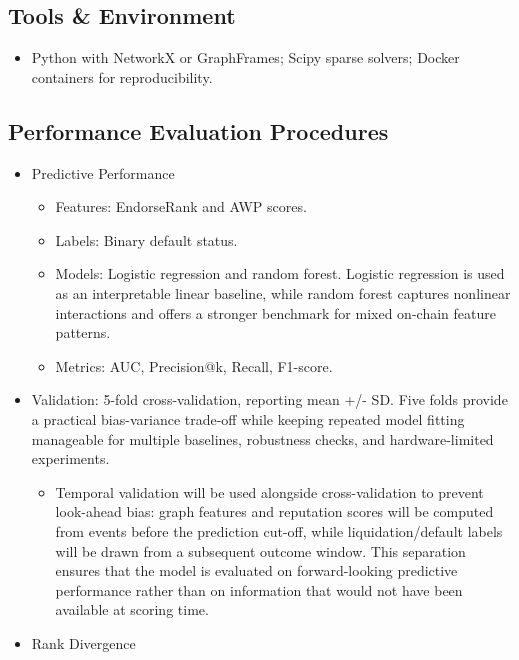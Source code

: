 \documentclass[
]{article}
\begin{document}
\subsection{Tools \& Environment}\label{tools-environment}

\begin{itemize}
\item
  Python with NetworkX or GraphFrames; Scipy sparse solvers; Docker containers for reproducibility.
\end{itemize}

\subsection{Performance Evaluation Procedures}\label{performance-evaluation-procedures}

\begin{itemize}
\item
  Predictive Performance

  \begin{itemize}
  \item
    Features: EndorseRank and AWP scores.
  \item
    Labels: Binary default status.
  \item
    Models: Logistic regression and random forest. Logistic regression is used as an interpretable linear baseline, while random forest captures nonlinear interactions and offers a stronger benchmark for mixed on-chain feature patterns.
  \item
    Metrics: AUC, Precision@k, Recall, F1-score.
  \end{itemize}
\item
  Validation: 5-fold cross-validation, reporting mean +/- SD. Five folds provide a practical bias-variance trade-off while keeping repeated model fitting manageable for multiple baselines, robustness checks, and hardware-limited experiments.

  \begin{itemize}
  \item
    Temporal validation will be used alongside cross-validation to prevent look-ahead bias: graph features and reputation scores will be computed from events before the prediction cut-off, while liquidation/default labels will be drawn from a subsequent outcome window. This separation ensures that the model is evaluated on forward-looking predictive performance rather than on information that would not have been available at scoring time.
  \end{itemize}
\item
  Rank Divergence


\end{itemize}
\end{document}
